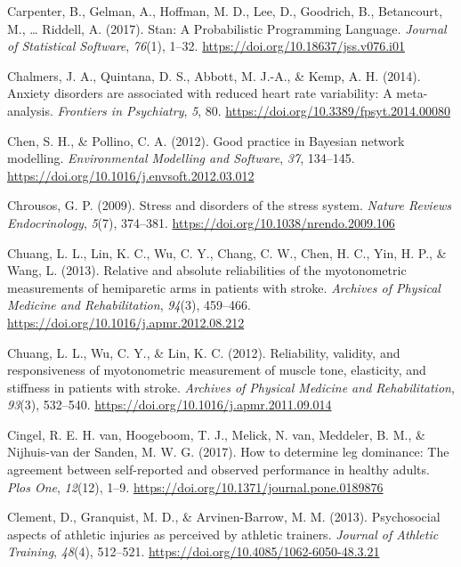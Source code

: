\documentclass[man,floatsintext]{apa6}
\begin{document}
\leavevmode\hypertarget{ref-Carpenter2017}{}%
Carpenter, B., Gelman, A., Hoffman, M. D., Lee, D., Goodrich, B., Betancourt, M., \ldots{} Riddell, A. (2017). Stan: A Probabilistic Programming Language. \emph{Journal of Statistical Software}, \emph{76}(1), 1--32. \url{https://doi.org/10.18637/jss.v076.i01}

\leavevmode\hypertarget{ref-Chalmers2014}{}%
Chalmers, J. A., Quintana, D. S., Abbott, M. J.-A., \& Kemp, A. H. (2014). Anxiety disorders are associated with reduced heart rate variability: A meta-analysis. \emph{Frontiers in Psychiatry}, \emph{5}, 80. \url{https://doi.org/10.3389/fpsyt.2014.00080}

\leavevmode\hypertarget{ref-Chen2012}{}%
Chen, S. H., \& Pollino, C. A. (2012). Good practice in Bayesian network modelling. \emph{Environmental Modelling and Software}, \emph{37}, 134--145. \url{https://doi.org/10.1016/j.envsoft.2012.03.012}

\leavevmode\hypertarget{ref-Chrousos2009}{}%
Chrousos, G. P. (2009). Stress and disorders of the stress system. \emph{Nature Reviews Endocrinology}, \emph{5}(7), 374--381. \url{https://doi.org/10.1038/nrendo.2009.106}

\leavevmode\hypertarget{ref-Chuang2013}{}%
Chuang, L. L., Lin, K. C., Wu, C. Y., Chang, C. W., Chen, H. C., Yin, H. P., \& Wang, L. (2013). Relative and absolute reliabilities of the myotonometric measurements of hemiparetic arms in patients with stroke. \emph{Archives of Physical Medicine and Rehabilitation}, \emph{94}(3), 459--466. \url{https://doi.org/10.1016/j.apmr.2012.08.212}

\leavevmode\hypertarget{ref-Chuang2012}{}%
Chuang, L. L., Wu, C. Y., \& Lin, K. C. (2012). Reliability, validity, and responsiveness of myotonometric measurement of muscle tone, elasticity, and stiffness in patients with stroke. \emph{Archives of Physical Medicine and Rehabilitation}, \emph{93}(3), 532--540. \url{https://doi.org/10.1016/j.apmr.2011.09.014}

\leavevmode\hypertarget{ref-VanCingel2017}{}%
Cingel, R. E. H. van, Hoogeboom, T. J., Melick, N. van, Meddeler, B. M., \& Nijhuis-van der Sanden, M. W. G. (2017). How to determine leg dominance: The agreement between self-reported and observed performance in healthy adults. \emph{Plos One}, \emph{12}(12), 1--9. \url{https://doi.org/10.1371/journal.pone.0189876}

\leavevmode\hypertarget{ref-Clement2013}{}%
Clement, D., Granquist, M. D., \& Arvinen-Barrow, M. M. (2013). Psychosocial aspects of athletic injuries as perceived by athletic trainers. \emph{Journal of Athletic Training}, \emph{48}(4), 512--521. \url{https://doi.org/10.4085/1062-6050-48.3.21}
\end{document}

